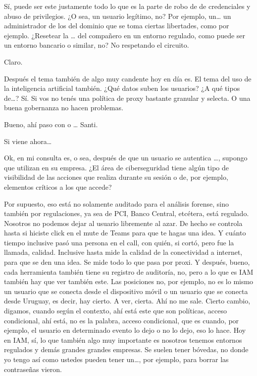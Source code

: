 \begin{description}[leftmargin=0cm, labelsep=0.5cm]
    \item[\textbf{PEÑA ALEJANDRO FRANCISCO:}] Sí, puede ser este justamente todo lo que es la parte de robo de de credenciales y abuso de privilegios. ¿O sea, un usuario legítimo, no? Por ejemplo, un… un administrador de los del dominio que se toma ciertas libertades, como por ejemplo. ¿Resetear la … del compañero en un entorno regulado, como puede ser un entorno bancario o similar, no? No respetando el circuito.

    \item[\textbf{MUNTAABSKI FEDERICO:}] Claro.

    \item[\textbf{PEÑA ALEJANDRO FRANCISCO:}] Después el tema también de algo muy candente hoy en día es. El tema del uso de la inteligencia artificial también. ¿Qué datos suben los usuarios? ¿A qué tipos de…? Sí. Si vos no tenés una política de proxy bastante granular y selecta. O una buena gobernanza no hacen problemas.

    \item[\textbf{MUNTAABSKI FEDERICO:}] Bueno, ahí paso con o … Santi.

    \item[\textbf{MOCIULSKY SANTIAGO:}] Si viene ahora…

    \item[\textbf{MOCIULSKY SANTIAGO:}] Ok, en mi consulta es, o sea, después de que un usuario se autentica …, supongo que utilizan en su empresa. ¿El área de ciberseguridad tiene algún tipo de visibilidad de las acciones que realiza durante su sesión o de, por ejemplo, elementos críticos a los que accede?

    \item[\textbf{PEÑA ALEJANDRO FRANCISCO:}] Por supuesto, eso está no solamente auditado para el análisis forense, sino también por regulaciones, ya sea de PCI, Banco Central, etcétera, está regulado. Nosotros no podemos dejar al usuario libremente al azar. De hecho se controla hasta si hiciste click en el mute de Teams para que te hagas una idea. Y cuánto tiempo inclusive pasó una persona en el call, con quién, si cortó, pero fue la llamada, calidad. Inclusive hasta mide la calidad de la conectividad a internet, para que se den una idea. Se mide todo lo que pasa por proxi. Y después, bueno, cada herramienta también tiene su registro de auditoría, no, pero a lo que es IAM también hay que ver también este. Las posiciones no, por ejemplo, no es lo mismo un usuario que se conecta desde el dispositivo móvil o un usuario que se conecta desde Uruguay, es decir, hay cierto. A ver, cierta. Ahí no me sale. Cierto cambio, digamos, cuando según el contexto, ahí está este que son políticas, acceso condicional, ahí está, no es la palabra, acceso condicional, que es cuando, por ejemplo, el usuario en determinado evento lo dejo o no lo dejo, eso lo hace. Hoy en IAM, sí, lo que también algo muy importante es nosotros tenemos entornos regulados y demás grandes grandes empresas. Se suelen tener bóvedas, no donde yo tengo así como ustedes pueden tener un…, por ejemplo, para borrar las contraseñas vieron.


\end{description}
